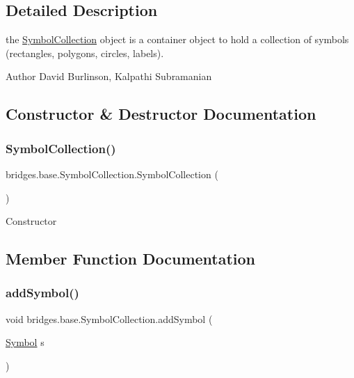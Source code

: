 \subsection{Detailed Description}
the \mbox{\hyperlink{classbridges_1_1base_1_1_symbol_collection}{Symbol\+Collection}} object is a container object to hold a collection of symbols (rectangles, polygons, circles, labels). 

\begin{DoxyAuthor}{Author}
David Burlinson, Kalpathi Subramanian 
\end{DoxyAuthor}


\subsection{Constructor \& Destructor Documentation}
\mbox{\label{classbridges_1_1base_1_1_symbol_collection_a8959dab963ce54f56560c6c27a3a3de5}} 
\subsubsection{\texorpdfstring{Symbol\+Collection()}{SymbolCollection()}}
{\footnotesize\ttfamily bridges.\+base.\+Symbol\+Collection.\+Symbol\+Collection (\begin{DoxyParamCaption}{ }\end{DoxyParamCaption})}

Constructor 

\subsection{Member Function Documentation}
\mbox{\label{classbridges_1_1base_1_1_symbol_collection_a8e934c53b78b05a7e982f3ff2362adea}} 
\subsubsection{\texorpdfstring{add\+Symbol()}{addSymbol()}}
{\footnotesize\ttfamily void bridges.\+base.\+Symbol\+Collection.\+add\+Symbol (\begin{DoxyParamCaption}\item[{\mbox{\hyperlink{classbridges_1_1base_1_1_symbol}{Symbol}}}]{s }\end{DoxyParamCaption})}

